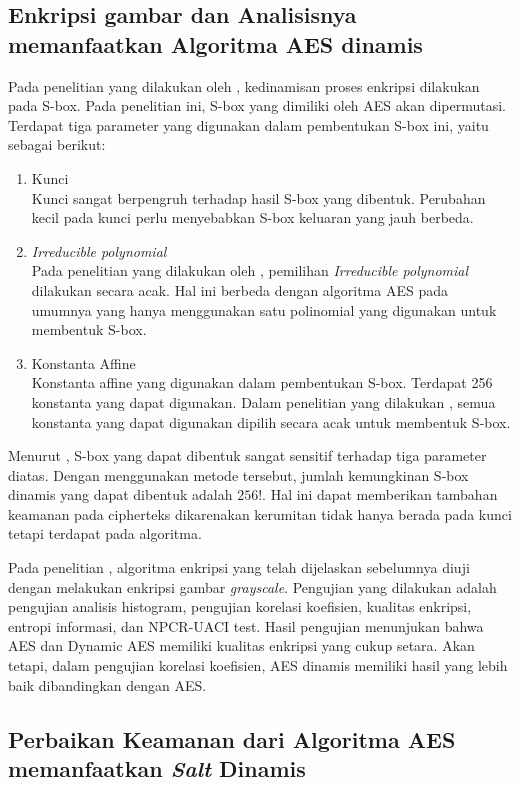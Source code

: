 \subsection{Enkripsi gambar dan Analisisnya memanfaatkan Algoritma AES dinamis}

Pada penelitian yang dilakukan oleh \textcite{singh2019}, kedinamisan proses enkripsi dilakukan pada S-box. Pada penelitian ini, S-box yang dimiliki oleh AES akan dipermutasi. Terdapat tiga parameter yang digunakan dalam pembentukan S-box ini, yaitu sebagai berikut:
\begin{enumerate}
  \item Kunci\\ Kunci sangat berpengruh terhadap hasil S-box yang dibentuk. Perubahan kecil pada kunci perlu menyebabkan S-box keluaran yang jauh berbeda.
  \item \emph{Irreducible polynomial}\\ Pada penelitian yang dilakukan oleh \textcite{singh2019}, pemilihan \emph{Irreducible polynomial} dilakukan secara acak. Hal ini berbeda dengan algoritma AES pada umumnya yang hanya menggunakan satu polinomial yang digunakan untuk membentuk S-box.
  \item Konstanta Affine\\ Konstanta affine yang digunakan dalam pembentukan S-box. Terdapat 256 konstanta yang dapat digunakan. Dalam penelitian yang dilakukan \textcite{singh2019}, semua konstanta yang dapat digunakan dipilih secara acak untuk membentuk S-box.
\end{enumerate}

Menurut \textcite{singh2019}, S-box yang dapat dibentuk sangat sensitif terhadap tiga parameter diatas. Dengan menggunakan metode tersebut, jumlah kemungkinan S-box dinamis yang dapat dibentuk adalah $256!$. Hal ini dapat memberikan tambahan keamanan pada cipherteks dikarenakan kerumitan tidak hanya berada pada kunci tetapi terdapat pada algoritma.

Pada penelitian \textcite{singh2019}, algoritma enkripsi yang telah dijelaskan sebelumnya diuji dengan melakukan enkripsi gambar \emph{grayscale}. Pengujian yang dilakukan adalah pengujian analisis histogram, pengujian korelasi koefisien, kualitas enkripsi, entropi informasi, dan NPCR-UACI test. Hasil pengujian menunjukan bahwa AES dan Dynamic AES memiliki kualitas enkripsi yang cukup setara. Akan tetapi, dalam pengujian korelasi koefisien, AES dinamis memiliki hasil yang lebih baik dibandingkan dengan AES.

\subsection{Perbaikan Keamanan dari Algoritma AES memanfaatkan \emph{Salt} Dinamis}


